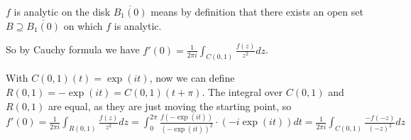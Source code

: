 \begin{cExercise}
	\begin{cPart}
		$f$ is analytic on the disk $\overline{B_1(0)}$ means by definition that there exists an open set $B\supseteq \overline{B_1(0)}$ on which $f$ is analytic.
		
		So by Cauchy formula we have $f'(0)=\frac1{2\pi i}\int_{C(0,1)}\frac{f(z)}{z^2}dz$.
		
		With $C(0,1)(t)=\exp(it)$, now we can define $R(0,1)=-\exp(it)=C(0,1)(t+\pi)$. The integral over $C(0,1)$ and $R(0,1)$ are equal, as they are just moving the starting point, so $f'(0)=\frac1{2\pi i}\int_{R(0,1)}\frac{f(z)}{z^2}dz=\int_0^{2\pi}\frac{f(-\exp(it))}{(-\exp(it))^2}\cdot(-i\exp(it))dt=\frac1{2\pi i}\int_{C(0,1)}\frac{-f(-z)}{(-z)^2}dz$
	\end{cPart}
\end{cExercise}





